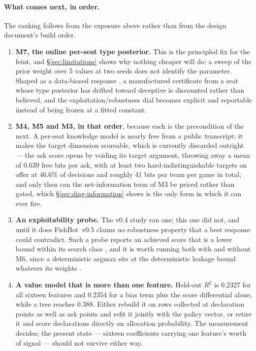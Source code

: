 \documentclass[11pt]{article}
\theoremstyle{definition}
\DeclareRobustCommand{\vfive}{\texorpdfstring{\mbox{FishBot v0.5}}{FishBot v0.5}}
\providecommand{\numTargetTwo}{46.6}
\providecommand{\numTargetBits}{0.639}
\providecommand{\numValueRSq}{0.2327}
\providecommand{\numValueRSqScore}{0.2354}
\providecommand{\numValueRSqTree}{0.388}
\providecommand{\numThetaSweepN}{5}
\providecommand{\numTargetBitsGame}{41}
\begin{document}
\paragraph{What comes next, in order.} The ranking follows from the exposure
above rather than from the design document's build order.

\begin{enumerate}[leftmargin=1.4em,itemsep=1pt,topsep=2pt,parsep=0pt]
\item \textbf{M7, the online per-seat type posterior.} This is the principled fix
      for the feint, and \S\ref{sec:limitations} shows why nothing cheaper will
      do: a sweep of the prior weight over \numThetaSweepN{} values at two seeds
      does not identify the parameter. Shaped as a data-biased response
      \cite{johanson-dbr}, a manufactured certificate from a seat whose type
      posterior has drifted toward deceptive is discounted rather than believed,
      and the exploitation/robustness dial becomes explicit and reportable
      \cite{johanson-rnash} instead of being frozen at a fitted constant.
\item \textbf{M4, M5 and M3, in that order}, because each is the precondition of
      the next. A per-seat knowledge model is nearly free from a public
      transcript; it makes the target dimension scoreable, which is currently
      discarded outright --- the ask score opens by voiding its target argument,
      throwing away a mean of \numTargetBits{} free bits per ask, with at least
      two hard-indistinguishable targets on offer at \numTargetTwo\% of
      decisions and roughly \numTargetBitsGame{} bits per team per game in
      total; and only
      then can the net-information term of M3 be priced rather than gated, which
      \S\ref{sec:diag-information} shows is the only form in which it can ever
      fire.
\item \textbf{An exploitability probe.} The v0.4 study ran one; this one
      did not, and until it does \vfive{} claims no robustness property that a best
      response could contradict. Such a probe reports an achieved score that is
      a lower bound within its search class \cite{lisy-lbr}, and it is worth
      running both with and without M6, since a deterministic argmax sits at
      the deterministic leakage bound whatever its weights
      \cite{alvim-leakage}.
\item \textbf{A value model that is more than one feature.} Held-out $R^2$ is
      \numValueRSq{} for all sixteen features and \numValueRSqScore{} for a bias
      term plus the score differential alone, while a tree reaches
      \numValueRSqTree{}. Either rebuild it on rows collected at declaration
      points as well as ask points and refit it jointly with the policy vector,
      or retire it and score declarations directly on allocation probability.
      The measurement decides; the present state --- sixteen coefficients
      carrying one feature's worth of signal --- should not survive either way.
\end{enumerate}
\end{document}
